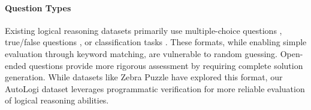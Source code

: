 \paragraph{Question Types}
Existing logical reasoning datasets primarily use multiple-choice questions \cite{liu2020logiqachallengedatasetmachine,bansal2023fewshotunifiedquestionanswering,zhong2021ar,srivastava2023beyond,suzgun2022challenging}, true/false questions \cite{han2024folionaturallanguagereasoning,ismayilzada2023crowbenchmarkingcommonsensereasoning}, or classification tasks \cite{sinha-etal-2019-clutrr,tian2021diagnosing}. These formats, while enabling simple evaluation through keyword matching, are vulnerable to random guessing. Open-ended questions provide more rigorous assessment by requiring complete solution generation. While datasets like Zebra Puzzle \cite{prosser1993hybrid} have explored this format, our AutoLogi dataset leverages programmatic verification for more reliable evaluation of logical reasoning abilities.


